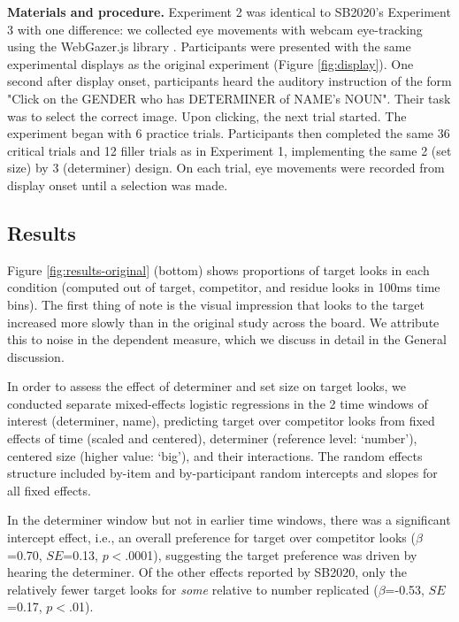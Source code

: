 \documentclass[10pt,letterpaper]{article}
\newcommand{\figref}[1]{Figure \ref{#1}}
\newcommand{\expref}[1]{Experiment #1}
\begin{document}
\textbf{Materials and procedure.} \expref{2} was identical to SB2020's \expref{3} with one difference: we collected eye movements with webcam eye-tracking using the WebGazer.js library \cite{papoutsaki2016webgazer}. Participants were presented with the same experimental displays as the original experiment (\figref{fig:display}). One second after display onset, participants heard the auditory instruction of the form "Click on the GENDER who has DETERMINER of NAME's NOUN". Their task was to select the correct image. Upon clicking, the next trial started. The experiment began with 6 practice trials. Participants then completed the same 36 critical trials and 12 filler trials as in \expref{1}, implementing the same 2 (set size) by 3 (determiner) design.  On each trial, eye movements were recorded from display onset until a selection was made.


\subsection{Results}

\figref{fig:results-original} (bottom) shows proportions of target looks in each condition (computed out of target, competitor, and residue looks in 100ms time bins). The first thing of note is the visual impression that looks to the target increased more slowly than in the original study across the board. We attribute this to noise in the dependent measure, which we discuss in detail in the General discussion.

In order to assess the effect of determiner and set size on target looks, we conducted separate mixed-effects logistic regressions in the 2 time windows of interest (determiner, name), predicting target over competitor looks from fixed effects of time (scaled and centered), determiner (reference level: `number'), centered size (higher value: `big'), and their interactions. The random effects structure included by-item and by-participant random intercepts and slopes for all  fixed effects.

In the determiner window but not in earlier time windows, there was a significant intercept effect, i.e., an overall preference for target over competitor looks ($\beta$=0.70, $SE$=0.13, $p<$.0001), suggesting the target preference was driven by hearing the determiner. Of the other effects reported by SB2020, only the relatively fewer target looks for \emph{some} relative to number replicated  ($\beta$=-0.53, $SE$=0.17, $p<$.01).
\end{document}
